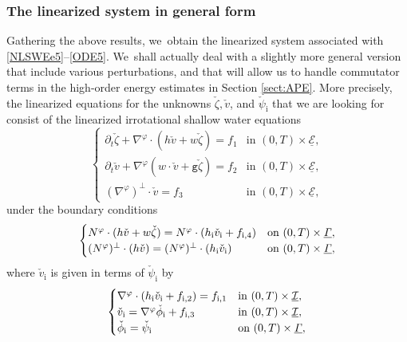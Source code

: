 \documentclass[JEP,XML,SOM,Unicode,NoFloatCountersInSection,published]{cedram}
\newcommand{\gr}{{\mathtt g}}
\newcommand{\dt}{\partial_t}
\newcommand{\cI}{{\mathcal I}}
\newcommand{\cE}{{\mathcal E}}
\newcommand{\ul}[1]{\underline{#1}}
\newcommand{\itGamma}{\mathit{\Gamma}}
\theoremstyle{definition}
\begin{document}
\subsubsection{The linearized system in general form}
Gathering the above results, we~obtain the linearized system associated with \eqref{NLSWEe5}--\eqref{ODE5}. We~shall actually deal with a slightly more general version that include various perturbations,
and that will allow us to handle commutator terms in the high-order energy estimates in Section \ref{sect:APE}.
More precisely, the linearized equations for the unknowns $\check{\zeta},\check{v}$, and $\check{\psi}_\mathrm{i}$
that we are looking for consist of the linearized irrotational shallow water equations
\begin{equation}\label{LSWEe2}
\begin{cases}
\dt\check{\zeta}+\nabla^\varphi\cdot(h\check{v}+w\check{\zeta}) = f_1 &\text{in } (0,T)\times\ul{\cE}, \\
\dt\check{v}+\nabla^\varphi(w\cdot\check{v}+\gr\check{\zeta}) = f_2 &\text{in } (0,T)\times\ul{\cE}, \\
(\nabla^\varphi)^\perp\cdot\check{v} = f_3 &\text{in } (0,T)\times\ul{\cE},
\end{cases}
\end{equation}
under the boundary conditions
\begin{equation}\label{LBC4}
\begin{cases}
N^\varphi\cdot(h\check{v}+w\check{\zeta}) = N^\varphi\cdot(h_\mathrm{i}\check{v}_\mathrm{i}+f_{{\rm i},4}) &\text{on } (0,T)\times\ul{\itGamma}, \\
(N^\varphi)^\perp\cdot(h\check{v})=(N^\varphi)^\perp\cdot(h_\mathrm{i}\check{v}_\mathrm{i}) &\text{on } (0,T)\times\ul{\itGamma},
\end{cases}
\end{equation}
where $\check{v}_\mathrm{i}$ is given in terms of $\check{\psi}_\mathrm{i}$ by
\begin{equation}\label{LSWEi2}
\begin{cases}
\nabla^\varphi\cdot(h_\mathrm{i}\check{v}_\mathrm{i}+f_{{\rm i},2})=f_{{\rm i},1} &\text{in } (0,T)\times\ul{\cI}, \\
\check{v}_\mathrm{i}=\nabla^\varphi\check{\phi}_\mathrm{i} + f_{{\rm i},3} &\text{in } (0,T)\times\ul{\cI}, \\
\check{\phi}_\mathrm{i}=\check{\psi}_\mathrm{i} &\text{on } (0,T)\times\ul{\itGamma},
\end{cases}
\end{equation}
\end{document}
